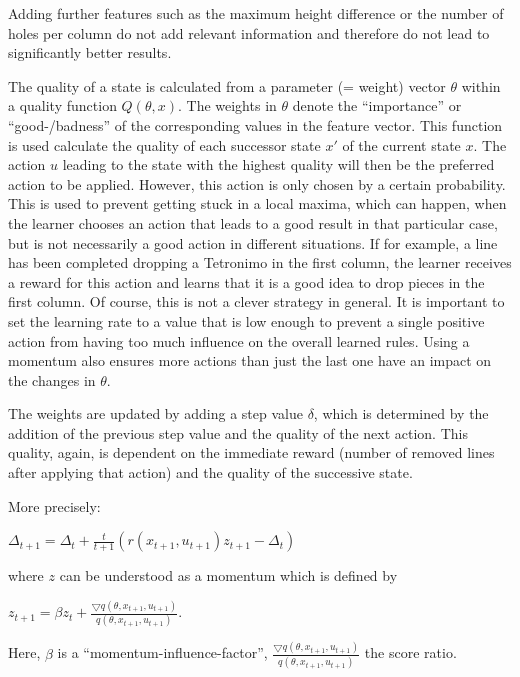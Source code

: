 \documentclass{ml}
\begin{document}
Adding further features such as the maximum height difference or the number of holes per column do not add relevant information and therefore do not lead to significantly better results. 

The quality of a state is calculated from a parameter (= weight) vector $\theta$ within a quality function $Q(\theta, x)$.
The weights in $\theta$ denote the ``importance'' or ``good-/badness'' of the corresponding values in the feature vector. 
This function is used calculate the quality of each successor state $x'$ of the current state $x$. 
The action $u$ leading to the state with the highest quality will then be the preferred action to be applied.
However, this action is only chosen by a certain probability.
This is used to prevent getting stuck in a local maxima, which can happen, when the learner chooses an action that leads to a good result in that particular case, but is not necessarily a good action in different situations. 
If for example, a line has been completed dropping a Tetronimo in the first column, the learner receives a reward for this action and learns that it is a good idea to drop pieces in the first column. 
Of course, this is not a clever strategy in general. 
It is important to set the learning rate to a value that is low enough to prevent a single positive action from having too much influence on the overall learned rules. Using a momentum  also ensures more actions than just the last one have an impact on the changes in $\theta$.

The weights are updated by adding a step value $\delta$, which is determined by the addition of the previous step value and the quality of the next action. 
This quality, again, is dependent on the immediate reward (number of removed lines after applying that action) and the quality of the successive state. 

More precisely:

$\Delta_{t+1} = \Delta_t + \frac{t}{t+1}(r(x_{t+1},u_{t+1})z_{t+1} - \Delta_t)$

where $z$ can be understood as a momentum which is defined by

$z_{t+1} = \beta z_t + \frac{\bigtriangledown q(\theta,x_{t+1},u_{t+1})}{q(\theta,x_{t+1},u_{t+1})}$.

Here, $\beta$ is a ``momentum-influence-factor'', $\frac{\bigtriangledown q(\theta,x_{t+1},u_{t+1})}{q(\theta,x_{t+1},u_{t+1})}$ the score ratio.

\end{document}
